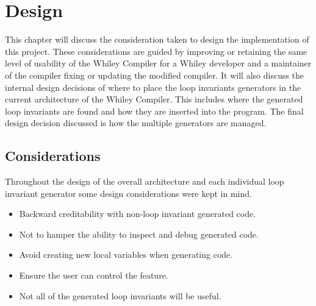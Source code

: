 \chapter{Design}\label{C:design}
%

%

This chapter will discuss the consideration taken to design the implementation
of this project.
These considerations are guided by improving or retaining the same level of 
usability of the Whiley Compiler for a Whiley developer and a maintainer of the
compiler fixing or updating the modified compiler. 
It will also discuss the internal design decisions of
where to place the loop invariants generators in the
current architecture of the Whiley Compiler.
This includes where the generated loop invariants are found and
how they are inserted into the program.
The final design decision discussed is how the multiple generators are managed.


\section{Considerations}

Throughout the design of the overall architecture and each individual loop invariant
generator some design considerations were kept in mind.
\begin{itemize}
    \item{Backward creditability with non-loop invariant generated code.}
    \item{Not to hamper the ability to inspect and debug generated code.}
    \item{Avoid creating new local variables when generating code.}
    \item{Ensure the user can control the feature.}
    \item{Not all of the generated loop invariants will be useful.}
\end{itemize}

